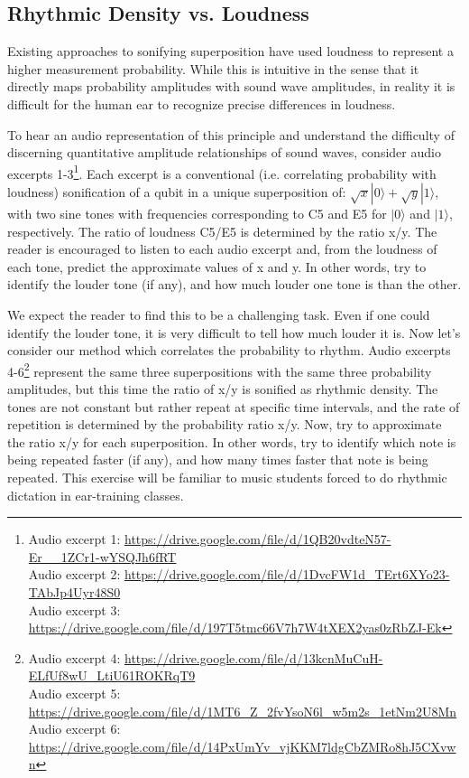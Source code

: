 \documentclass[10pt,twocolumn]{article}
\begin{document}
\subsection{Rhythmic Density vs. Loudness}

Existing approaches to sonifying superposition have used loudness to represent a higher measurement probability\cite{qmuvi}. While this is intuitive in the sense that it directly maps probability amplitudes with sound wave amplitudes, in reality it is difficult for the human ear to recognize precise differences in loudness\cite{kulkarni2001}.

To hear an audio representation of this principle and understand the difficulty of discerning quantitative amplitude relationships of sound waves, consider audio excerpts 1-3\footnote{Audio excerpt 1: \url{https://drive.google.com/file/d/1QB20vdteN57-Er__1ZCr1-wYSQJh6fRT} \\ Audio excerpt 2: \url{https://drive.google.com/file/d/1DvcFW1d_TErt6XYo23-TAbJp4Uyr48S0} \\ Audio excerpt 3: \url{https://drive.google.com/file/d/197T5tmc66V7h7W4tXEX2yas0zRbZJ-Ek}}.
Each excerpt is a conventional (i.e. correlating probability with loudness) sonification of a qubit in a unique superposition of: $\sqrt{x}|0\rangle + \sqrt{y}|1\rangle$, with two sine tones with frequencies corresponding to C5 and E5 for $|0\rangle$ and $|1\rangle$, respectively. The ratio of loudness C5/E5 is determined by the ratio x/y. The reader is encouraged to listen to each audio excerpt and, from the loudness of each tone, predict the approximate values of x and y. In other words, try to identify the louder tone (if any), and how much louder one tone is than the other.

We expect the reader to find this to be a challenging task. Even if one could identify the louder tone, it is very difficult to tell how much louder it is. Now let’s consider our method which correlates the probability to rhythm. Audio excerpts 4-6\footnote{Audio excerpt 4: \url{https://drive.google.com/file/d/13kcnMuCuH-ELfUf8wU_LtiU61ROKRqT9} \\ Audio excerpt 5: \url{https://drive.google.com/file/d/1MT6_Z_2fvYsoN6l_w5m2s_1etNm2U8Mn} \\ Audio excerpt 6: \url{https://drive.google.com/file/d/14PxUmYv_vjKKM7ldgCbZMRo8hJ5CXvwn}} represent the same three superpositions with the same three probability amplitudes, but this time the ratio of x/y is sonified as rhythmic density. The tones are not constant but rather repeat at specific time intervals, and the rate of repetition is determined by the probability ratio x/y. Now, try to approximate the ratio x/y for each superposition. In other words, try to identify which note is being repeated faster (if any), and how many times faster that note is being repeated. This exercise will be familiar to music students forced to do rhythmic dictation in ear-training classes.
\end{document}
